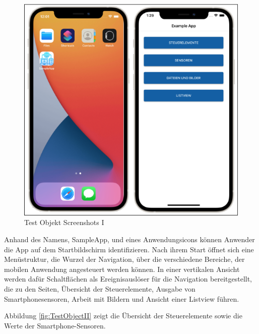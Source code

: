 \begin{figure}[!ht]
 \includegraphics[width=\textwidth,keepaspectratio]{Images/Screenshot/AppIconAndMenu.png}
 \caption{Test Objekt Screenshots I}
 \label{fig:TestObjectI}
\end{figure}

Anhand des Namens,  SampleApp,  und eines Anwendungsicons können Anwender die App auf dem Startbildschirm identifizieren.  Nach ihrem Start öffnet sich eine Menüstruktur,  die Wurzel der Navigation, über die verschiedene Bereiche, der mobilen Anwendung angesteuert werden können.  In einer vertikalen Ansicht werden dafür Schaltflächen als Ereignisauslöser für die Navigation bereitgestellt,  die zu den Seiten, Übersicht der Steuerelemente,  Ausgabe von Smartphonesensoren,  Arbeit mit Bildern und Ansicht einer Listview führen.  

Abbildung \ref{fig:TestObjectII} zeigt die Übersicht der Steuerelemente sowie die Werte der Smartphone-Sensoren.

